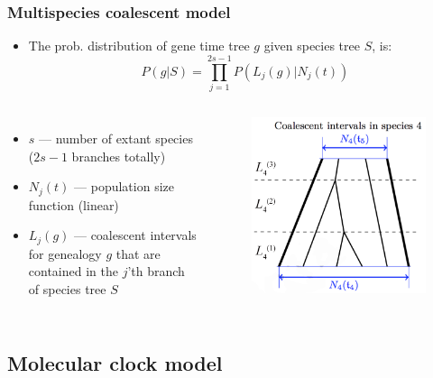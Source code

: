 \begin{frame}\frametitle{Multispecies coalescent model}
	\begin{itemize}
		\item The prob. distribution of gene time tree $g$ given species tree $S$, is:		
		\[ P(g|S) = \prod_{j=1}^{2s-1} P(L_j(g)|N_j(t)) \]
	\end{itemize}
	\begin{columns}
	\column{5.4cm}
		\begin{itemize}
			\item $s$ --- number of extant species ($2s-1$ branches totally)
			\item $N_j(t)$ --- population size function (linear)
			\item $L_j(g)$ --- coalescent intervals for genealogy $g$ that are contained in the $j$'th branch of species tree $S$
		\end{itemize}
	\column{4cm}
    \begin{figure}[h!]
    	\includegraphics[width=1.0\textwidth]{figures/mscPopulation4}
  	\end{figure}
	\end{columns}
\end{frame}

\subsection{Molecular clock model}

